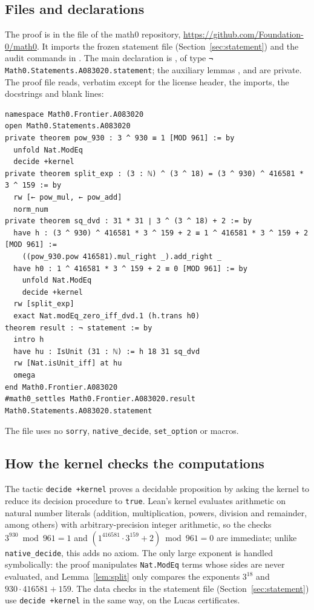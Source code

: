 \documentclass[11pt]{amsart}
\theoremstyle{plain}
\theoremstyle{definition}
\begin{document}
\subsection*{Files and declarations}
The proof is in the file  of the math0 repository, \url{https://github.com/Foundation-0/math0}.
It imports the frozen statement file  (Section~\ref{sec:statement}) and the audit commands in .
The main declaration is , of type \texttt{¬ Math0.Statements.A083020.statement}; the auxiliary lemmas ,  and  are private.
The proof file reads, verbatim except for the license header, the imports, the docstrings and blank lines:
\begin{lstlisting}
namespace Math0.Frontier.A083020
open Math0.Statements.A083020
private theorem pow_930 : 3 ^ 930 ≡ 1 [MOD 961] := by
  unfold Nat.ModEq
  decide +kernel
private theorem split_exp : (3 : ℕ) ^ (3 ^ 18) = (3 ^ 930) ^ 416581 * 3 ^ 159 := by
  rw [← pow_mul, ← pow_add]
  norm_num
private theorem sq_dvd : 31 * 31 ∣ 3 ^ (3 ^ 18) + 2 := by
  have h : (3 ^ 930) ^ 416581 * 3 ^ 159 + 2 ≡ 1 ^ 416581 * 3 ^ 159 + 2 [MOD 961] :=
    ((pow_930.pow 416581).mul_right _).add_right _
  have h0 : 1 ^ 416581 * 3 ^ 159 + 2 ≡ 0 [MOD 961] := by
    unfold Nat.ModEq
    decide +kernel
  rw [split_exp]
  exact Nat.modEq_zero_iff_dvd.1 (h.trans h0)
theorem result : ¬ statement := by
  intro h
  have hu : IsUnit (31 : ℕ) := h 18 31 sq_dvd
  rw [Nat.isUnit_iff] at hu
  omega
end Math0.Frontier.A083020
#math0_settles Math0.Frontier.A083020.result Math0.Statements.A083020.statement
\end{lstlisting}
The file uses no \texttt{sorry}, \texttt{native\_decide}, \texttt{set\_option} or macros.

\subsection*{How the kernel checks the computations}
The tactic \texttt{decide +kernel} proves a decidable proposition by asking the kernel to reduce its decision procedure to \texttt{true}.
Lean's kernel evaluates arithmetic on natural number literals (addition, multiplication, powers, division and remainder, among others) with arbitrary-precision integer arithmetic, so the checks $3^{930}\bmod961=1$ and $(1^{416581}\cdot3^{159}+2)\bmod961=0$ are immediate; unlike \texttt{native\_decide}, this adds no axiom.
The only large exponent is handled symbolically: the proof manipulates \texttt{Nat.ModEq} terms whose sides are never evaluated, and Lemma~\ref{lem:split} only compares the exponents $3^{18}$ and $930\cdot416581+159$.
The data checks in the statement file (Section~\ref{sec:statement}) use \texttt{decide +kernel} in the same way, on the Lucas certificates.
\end{document}

